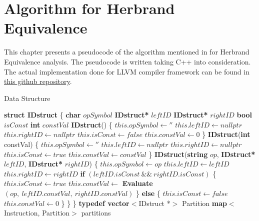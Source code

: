 \chapter{Algorithm for Herbrand Equivalence}
\label{chap:chapter7}

This chapter presents a pseudocode of the algorithm mentioned in 
\cite{Babu} for Herbrand Equivalence analysis. The pseudocode is 
written taking C++ into consideration. The actual implementation done 
for LLVM compiler framework can be found in 
\href{https://github.com/himanshu520/HerbrandEquivalence}{this github repository}.

\begin{algorithm}
\caption{Data Structure}\label{DataStructure}
\begin{algorithmic}[1]
\State \textbf{struct IDstruct} \{
    \State \tabf \textbf{char} $opSymbol$
    \State \tabf \textbf{IDstruct*} $leftID$
    \State \tabf \textbf{IDstruct*} $rightID$
    \State \tabf \textbf{bool} $isConst$
    \State \tabf \textbf{int} $constVal$
    \State
    \State \tabf \textbf{IDstruct}() \{
        \State \tabs $this.opSymbol \gets ''$ 
        \State \tabs $this.leftID \gets nullptr$
        \State \tabs $this.rightID \gets nullptr$
        \State \tabs $this.isConst \gets false$
        \State \tabs $this.constVal \gets 0$ 
    \State \tabf \}
    \State
    \State \tabf \textbf{IDstruct}(\textbf{int} constVal) \{
        \State \tabs $this.opSymbol \gets ''$ 
        \State \tabs $this.leftID \gets nullptr$
        \State \tabs $this.rightID \gets nullptr$
        \State \tabs $this.isConst \gets true$
        \State \tabs $this.constVal \gets constVal$ 
    \State \tabf \}
    \State
    \State \tabf \textbf{IDstruct}(\textbf{string} $op$, \textbf{IDstruct*} $leftID$, \textbf{IDstruct*} $rightID$) \{
        \State {}
        \State \tabs $this.opSymbol \gets op$ 
        \State \tabs $this.leftID \gets leftID$
        \State \tabs $this.rightID \gets rightID$
        \State
        \State \tabs \textbf{if} $(leftID.isConst \ \&\& \ rightID.isConst)$ \{
            \State \tabt $this.isConst \gets true$
            \State \tabt $this.constVal \gets$ \textbf{Evaluate}$(op,\  leftID.constVal,\ rightID.constVal)$
        \State \tabs \} \textbf{else} \{
            \State \tabt $this.isConst \gets false$
            \State \tabt $this.constVal \gets 0$
        \State \tabs \}
    \State \tabf \}
\State \}
\State
\State \textbf{typedef vector}$<$IDstruct *$>$ Partition
\State \textbf{map}$<$Instruction, Partition$>$ partitions
\end{algorithmic}
\end{algorithm}

